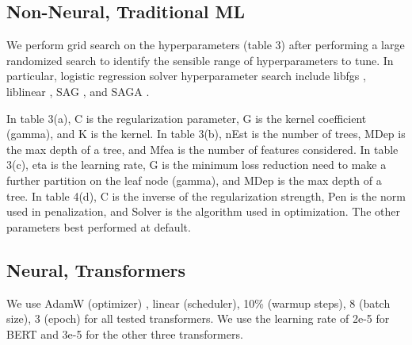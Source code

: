 \documentclass[11pt]{article}
\begin{document}
\subsection{Non-Neural, Traditional ML}
We perform grid search on the hyperparameters (table 3) after performing a large randomized search to identify the sensible range of hyperparameters to tune. In particular, logistic regression solver hyperparameter search include libfgs \citep{zhu2011bfgs}, liblinear \citep{fan2008liblinear}, SAG \citep{schmidt2017minimizing}, and SAGA \citep{defazio2014saga}. 

In table 3(a), C is the regularization parameter, G is the kernel coefficient (gamma), and K is the kernel. In table 3(b), nEst is the number of trees, MDep is the max depth of a tree, and Mfea is the number of features considered. In table 3(c), eta is the learning rate, G is the minimum loss reduction need to make a further partition on the leaf node (gamma), and MDep is the max depth of a tree. In table 4(d), C is the inverse of the regularization strength, Pen is the norm used in penalization, and Solver is the algorithm used in optimization. The other parameters best performed at default.

\subsection{Neural, Transformers}
We use AdamW (optimizer) \citep{kingma2014adam}, linear (scheduler), 10\% (warmup steps), 8 (batch size), 3 (epoch) for all tested transformers. We use the learning rate of 2e-5 for BERT and 3e-5 for the other three transformers.
\end{document}
